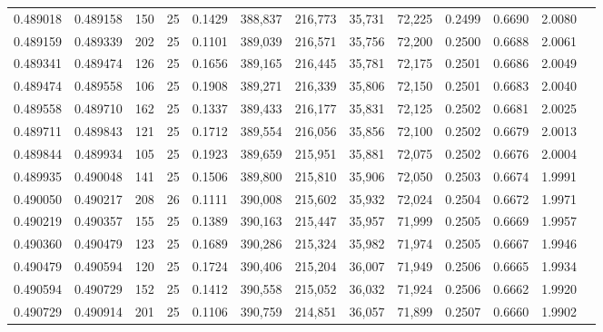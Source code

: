 \begin{tabular}{rrrrrrrrrrrrr}
0.489018 & 0.489158 &   150 &  25 &                                     0.1429 & 388,837 & 216,773 &  35,731 &  72,225 & 0.2499 & 0.6690 & 2.0080 \\
0.489159 & 0.489339 &   202 &  25 &                                     0.1101 & 389,039 & 216,571 &  35,756 &  72,200 & 0.2500 & 0.6688 & 2.0061 \\
0.489341 & 0.489474 &   126 &  25 &                                     0.1656 & 389,165 & 216,445 &  35,781 &  72,175 & 0.2501 & 0.6686 & 2.0049 \\
0.489474 & 0.489558 &   106 &  25 &                                     0.1908 & 389,271 & 216,339 &  35,806 &  72,150 & 0.2501 & 0.6683 & 2.0040 \\
0.489558 & 0.489710 &   162 &  25 &                                     0.1337 & 389,433 & 216,177 &  35,831 &  72,125 & 0.2502 & 0.6681 & 2.0025 \\
0.489711 & 0.489843 &   121 &  25 &                                     0.1712 & 389,554 & 216,056 &  35,856 &  72,100 & 0.2502 & 0.6679 & 2.0013 \\
0.489844 & 0.489934 &   105 &  25 &                                     0.1923 & 389,659 & 215,951 &  35,881 &  72,075 & 0.2502 & 0.6676 & 2.0004 \\
0.489935 & 0.490048 &   141 &  25 &                                     0.1506 & 389,800 & 215,810 &  35,906 &  72,050 & 0.2503 & 0.6674 & 1.9991 \\
0.490050 & 0.490217 &   208 &  26 &                                     0.1111 & 390,008 & 215,602 &  35,932 &  72,024 & 0.2504 & 0.6672 & 1.9971 \\
0.490219 & 0.490357 &   155 &  25 &                                     0.1389 & 390,163 & 215,447 &  35,957 &  71,999 & 0.2505 & 0.6669 & 1.9957 \\
0.490360 & 0.490479 &   123 &  25 &                                     0.1689 & 390,286 & 215,324 &  35,982 &  71,974 & 0.2505 & 0.6667 & 1.9946 \\
0.490479 & 0.490594 &   120 &  25 &                                     0.1724 & 390,406 & 215,204 &  36,007 &  71,949 & 0.2506 & 0.6665 & 1.9934 \\
0.490594 & 0.490729 &   152 &  25 &                                     0.1412 & 390,558 & 215,052 &  36,032 &  71,924 & 0.2506 & 0.6662 & 1.9920 \\
0.490729 & 0.490914 &   201 &  25 &                                     0.1106 & 390,759 & 214,851 &  36,057 &  71,899 & 0.2507 & 0.6660 & 1.9902 \\

\end{tabular}
